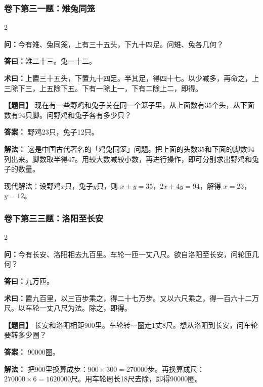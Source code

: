 \documentclass[11pt,a4paper]{article}
\begin{document}
\vspace{0.3cm}

\subsubsection*{卷下第三一题：雉兔同笼}
\begin{paracol}{2}
\begin{problemclassical}
\textbf{问：}今有雉、兔同笼，上有三十五头，下九十四足。问雉、兔各几何？

\textbf{答曰：}雉二十三。兔一十二。

\textbf{术曰：}上置三十五头，下置九十四足。半其足，得四十七。以少减多，再命之，上三除下三，上五除下五。下有一除上一，下有二除上二，即得。
\end{problemclassical}
\switchcolumn
\begin{problemmodern}
\textbf{【题目】} 现在有一些野鸡和兔子关在同一个笼子里，从上面数有35个头，从下面数有94只脚。问野鸡和兔子各有多少只？

\textbf{答案：} 野鸡23只，兔子12只。

\textbf{解法：} 这是中国古代著名的「鸡兔同笼」问题。把上面的头数35和下面的脚数94列出来。脚数取半得47。用较大数减较小数，再进行操作，即可分别求出野鸡和兔子的数量。

现代解法：设野鸡$x$只，兔子$y$只，则 $x+y=35$，$2x+4y=94$，解得 $x=23$，$y=12$。
\end{problemmodern}
\end{paracol}

\vspace{0.3cm}

\subsubsection*{卷下第三三题：洛阳至长安}
\begin{paracol}{2}
\begin{problemclassical}
\textbf{问：}今有长安、洛阳相去九百里。车轮一匝一丈八尺。欲自洛阳至长安，问轮匝几何？

\textbf{答曰：}九万匝。

\textbf{术曰：}置九百里，以三百步乘之，得二十七万步。又以六尺乘之，得一百六十二万尺。以车轮一丈八尺为法。除之，即得。
\end{problemclassical}
\switchcolumn
\begin{problemmodern}
\textbf{【题目】} 长安和洛阳相距900里。车轮转一圈走1丈8尺。想从洛阳到长安，问车轮要转多少圈？

\textbf{答案：} 90000圈。

\textbf{解法：} 把900里换算成步：$900 \times 300 = 270000$步。再换算成尺：$270000 \times 6 = 1620000$尺。用车轮周长18尺去除，即得90000圈。
\end{problemmodern}
\end{paracol}
\end{document}
